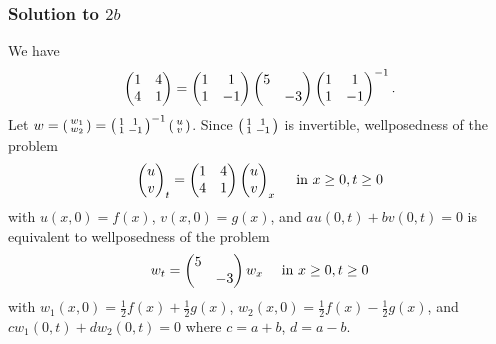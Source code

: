 \subsubsection*{Solution to $2b$}
We have
$$\pmat{1}{4}{4}{1} = \pmat{1}{1}{1}{-1}\pmat{5}{}{}{-3}\pmat{1}{1}{1}{-1}^{-1}.$$
Let $w = \svt{w_1}{w_2} = \smat{1}{1}{1}{-1}^{-1}\svt{u}{v}$. Since $\smat{1}{1}{1}{-1}$ is invertible,
wellposedness of the problem
$$\vct{u}{v}_{t} = \pmat{1}{4}{4}{1}\vct{u}{v}_{x}\quad \text{ in $x \geq 0, t \geq 0$}$$
with $u(x, 0) = f(x)$, $v(x, 0) = g(x)$, and $au(0, t) + bv(0, t) =0$ is equivalent to wellposedness of the problem
$$w_{t} = \pmat{5}{}{}{-3}w_{x}\quad \text{ in $x \geq 0, t \geq 0$}$$
with $w_{1}(x, 0) = \frac{1}{2}f(x) + \frac{1}{2}g(x)$, $w_{2}(x, 0) = \frac{1}{2}f(x)- \frac{1}{2}g(x)$,
and $cw_{1}(0, t) + dw_{2}(0, t) = 0$ where $c = a + b$, $d = a - b$.

